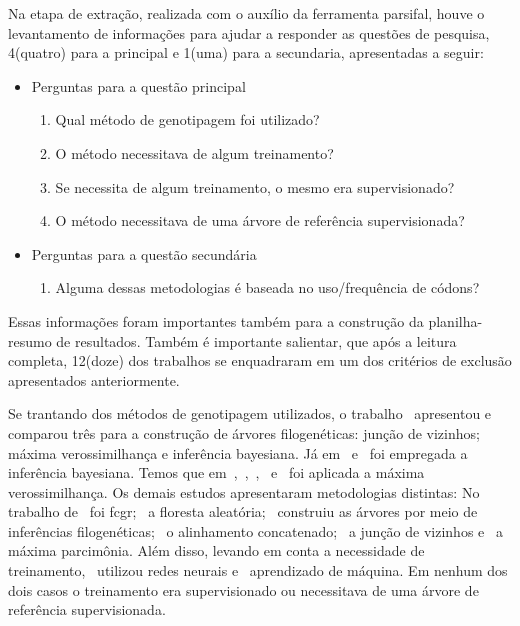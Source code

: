 \documentclass[12pt]{article}
\begin{document}
Na etapa de extração, realizada com o auxílio da ferramenta \gls{parsifal}, houve o levantamento de informações para ajudar a responder as questões de pesquisa, 4(quatro) para a principal e 1(uma) para a secundaria, apresentadas a seguir:
\begin{itemize}
    \item Perguntas para a questão principal
          \begin{enumerate}
              \item Qual método de genotipagem foi utilizado?
              \item O método necessitava de algum treinamento?
              \item Se necessita de algum treinamento, o mesmo era supervisionado?
              \item O método necessitava de uma árvore de referência supervisionada?
          \end{enumerate}
    \item Perguntas para a questão secundária
          \begin{enumerate}
              \item Alguma dessas metodologias é baseada no uso/frequência de códons?
          \end{enumerate}
\end{itemize}

Essas informações foram importantes também para a construção da planilha-resumo de resultados. Também é importante salientar, que após a leitura completa, 12(doze) dos trabalhos se enquadraram em um dos critérios de exclusão apresentados anteriormente.

Se trantando dos métodos de genotipagem utilizados, o trabalho~\cite{dimitrov_updated_2019} apresentou e comparou três para a construção de árvores filogenéticas: junção de vizinhos; máxima verossimilhança e inferência bayesiana.
Já em~\cite{yin_systematic_2019} e~\cite{bedoya-pilozo_molecular_epidemiology_2018} foi empregada a inferência bayesiana. Temos que em~\cite{fall_genetic_diversity_2021},~\cite{behl_threat_2022},~\cite{shabbir_comprehensive_2020},~\cite{hudu_hepatitis_2018} e~\cite{cho_analysis_2022} foi aplicada a máxima verossimilhança.
Os demais estudos apresentaram metodologias distintas: No trabalho de~\cite{lichtblau_alignment-free_2019} foi \gls{fcgr};~\cite{kim_ngs_2022} a floresta aleatória;~\cite{sallard_tracing_2021} construiu as árvores por meio de inferências filogenéticas;~\cite{paez-espino_diversity_evolution_2019} o alinhamento concatenado;~\cite{potdar_phylogenetic_2021} a junção de vizinhos e~\cite{tang_evolutionary_2021} a máxima parcimônia.
Além disso, levando em conta a necessidade de treinamento,~\cite{lichtblau_alignment-free_2019} utilizou redes neurais e~\cite{kim_ngs_2022} aprendizado de máquina. Em nenhum dos dois casos o treinamento era supervisionado ou necessitava de uma árvore de referência supervisionada.
\end{document}
